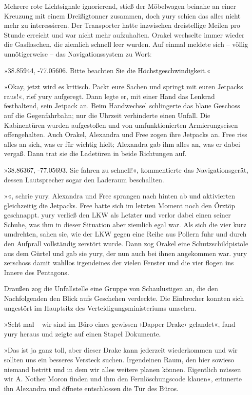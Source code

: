 Mehrere rote Lichtsignale ignorierend, stieß der Möbelwagen beinahe an einer Kreuzung mit einem Dreißigtonner zusammen, doch yury schien das alles nicht mehr zu interessieren. Der Transporter hatte inzwischen dreistellige Meilen pro Stunde erreicht und war nicht mehr aufzuhalten. Orakel wechselte immer wieder die Gasflaschen, die ziemlich schnell leer wurden. Auf einmal meldete sich – völlig unnötigerweise – das Navigationssystem zu Wort:

»38.85944, -77.05606. Bitte beachten Sie die Höchstgeschwindigkeit.«

»Okay, jetzt wird es kritisch. Packt eure Sachen und springt mit euren Jetpacks raus!«, rief yury aufgeregt. Dann legte er, mit einer Hand das Lenkrad festhaltend, sein Jetpack an. Beim Handwechsel schlingerte das blaue Geschoss auf die Gegenfahrbahn; nur die Uhrzeit verhinderte einen Unfall. Die Kabinentüren wurden aufgestoßen und von umfunktionierten Armierungseisen offengehalten. Auch Orakel, Alexandra und Free zogen ihre Jetpacks an. Free riss alles an sich, was er für wichtig hielt; Alexandra gab ihm alles an, was er dabei vergaß. Dann trat sie die Ladetüren in beide Richtungen auf.

»38.86367, -77.05693. Sie fahren zu schnell!«, kommentierte das Navigationsgerät, dessen Lautsprecher sogar den Laderaum beschallten.

»«, schrie yury. Alexandra und Free sprangen nach hinten ab und aktivierten gleichzeitig die Jetpacks. Free hatte sich im letzten Moment noch den Örztöp geschnappt. yury verließ den LKW als Letzter und verlor dabei einen seiner Schuhe, was ihm in dieser Situation aber ziemlich egal war. Als sich die vier kurz umdrehten, sahen sie, wie der LKW gegen eine Reihe aus Pollern fuhr und durch den Aufprall vollständig zerstört wurde. Dann zog Orakel eine Schutzschildpistole aus dem Gürtel und gab sie yury, der nun auch bei ihnen angekommen war. yury zerschoss damit wahllos irgendeines der vielen Fenster und die vier flogen ins Innere des Pentagons.

Draußen zog die Unfallstelle eine Gruppe von Schaulustigen an, die den Nachfolgenden den Blick aufs Geschehen verdeckte. Die Einbrecher konnten sich ungestört im Hauptsitz des Verteidigungsministeriums umsehen.

»Seht mal – wir sind im Büro eines gewissen ›Dapper Drake‹ gelandet«, fand yury heraus und zeigte auf einen Stapel Dokumente.

»Das ist ja ganz toll, aber dieser Drake kann jederzeit wiederkommen und wir sollten uns ein besseres Versteck suchen. Irgendeinen Raum, den hier sowieso niemand betritt und in dem wir alles weitere planen können. Eigentlich müssen wir A. Nother Moron finden und ihm den Fernlöschungscode klauen«, erinnerte ihn Alexandra und öffnete entschlossen die Tür des Büros.

